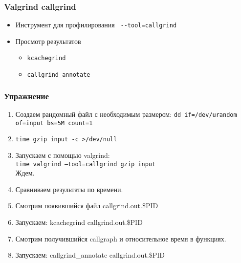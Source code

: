 \begin{frame}[fragile]
 \frametitle{Valgrind callgrind}
 \begin{itemize}
  \item Инструмент для профилирования \verb+ --tool=callgrind+
  \item Просмотр результатов
    \begin{itemize}
      \item \texttt{kcachegrind}
      \item \texttt{callgrind\_annotate}
    \end{itemize}
 \end{itemize}
\end{frame}


\begin{frame}[fragile]
    \frametitle{Упражнение}
    \begin{enumerate}
        \item Создаем рандомный файл с необходимым размером: {\tt dd if=/dev/urandom of=input bs=5M count=1}
        \item {\tt time gzip input -c >/dev/null}
        \item Запускаем с помощью valgrind: \\
	    {\tt time valgrind --tool=callgrind gzip input} \\
	    Ждем.
        \item Сравниваем результаты по времени.
        \item Смотрим появившийся файл callgrind.out.\$PID
        \item Запускаем: kcachegrind callgrind.out.\$PID
	\item Смотрим получившийся callgraph и относительное время в функциях.
        \item Запускаем: callgrind\_annotate callgrind.out.\$PID
    \end{enumerate}
\end{frame}
